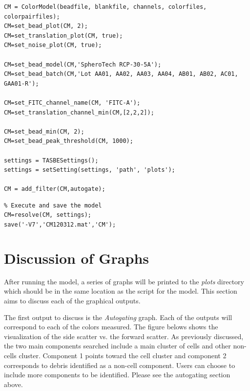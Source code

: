 \begin{minipage}{0.95\textwidth} 
\begin{lstlisting}
CM = ColorModel(beadfile, blankfile, channels, colorfiles, colorpairfiles);
CM=set_bead_plot(CM, 2); 
CM=set_translation_plot(CM, true);
CM=set_noise_plot(CM, true);

CM=set_bead_model(CM,'SpheroTech RCP-30-5A'); 
CM=set_bead_batch(CM,'Lot AA01, AA02, AA03, AA04, AB01, AB02, AC01, GAA01-R'); 

CM=set_FITC_channel_name(CM, 'FITC-A');
CM=set_translation_channel_min(CM,[2,2,2]);

CM=set_bead_min(CM, 2);
CM=set_bead_peak_threshold(CM, 1000);

settings = TASBESettings();
settings = setSetting(settings, 'path', 'plots');

CM = add_filter(CM,autogate);

\end{lstlisting}
\end{minipage}

\begin{minipage} {0.95\textwidth} 
\begin{lstlisting}
% Execute and save the model
CM=resolve(CM, settings);
save('-V7','CM120312.mat','CM');
\end{lstlisting}
\end{minipage}

\section*{Discussion of Graphs}
  
After running the model, a series of graphs will be printed to the \textit{plots} directory which should be in the same location as the script for the model. This section aims to discuss each of the graphical outputs. 

The first output to discuss is the \textit{Autogating} graph. Each of the outputs will correspond to each of the colors measured. The figure belows shows the visualization of the side scatter vs. the forward scatter. As previously discussed, the two main components searched include a main cluster of cells and other non-cells cluster. Component 1 points toward the cell cluster and component 2 corresponds to debris identified as a non-cell component. Users can choose to include more components to be identified. Please see the autogating section above. 


